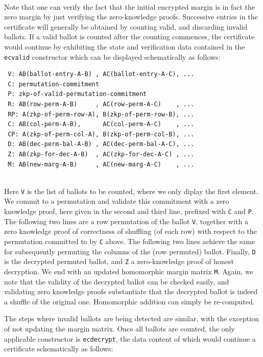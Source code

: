  \mbox{}\\[-5ex]
 Note that one can verify the fact that the initial encrypted margin
 is in fact the zero margin by just verifying the zero-knowledge
 proofs. Successive entries in the certificate will generally be
 obtained by counting valid, and discarding invalid ballots. If a
 valid ballot is counted after the counting commences, the
 certificate would continue by exhibiting the state and verification
 data contained in the \texttt{ecvalid} constructor which can be
 displayed schematically as follows:

 {\small\begin{verbatim}
 V: AB(ballot-entry-A-B) , AC(ballot-entry-A-C), ...
 C: permutation-commitment
 P: zkp-of-valid-permutation-commitment
 R: AB(row-perm-A-B)     , AC(row-perm-A-C)    , ...
 RP: A(zkp-of-perm-row-A), B(zkp-of-perm-row-B), ... 
 C: AB(col-perm-A-B),      AC(col-perm-A-C)    , ...
 CP: A(zkp-of-perm-col-A), B(zkp-of-perm-col-B), ...
 D: AB(dec-perm-bal-A-B) , AC(dec-perm-bal-A-C), ...
 Z: AB(zkp-for-dec-A-B)  , AC(zkp-for-dec-A-C) , ...
 M: AB(new-marg-A-B)     , AC(new-marg-A-C)    , ...
 \end{verbatim}}

 \mbox{}\\[-5ex]
 Here \texttt{V} is the list of ballots to be counted, where we only
 diplay the first element. We
 commit to a permutation and validate this commitment with a zero
 knowledge proof, here given in the second and third line, prefixed
 with \texttt{C} and \texttt{P}. The following two lines are a row
 permutation of the ballot \texttt{V}, together with a zero
 knowledge proof of correctness of shuffling (of each row) with
 respect to the permutation committed to by \texttt{C} above. The
 following two lines achieve the same for subsequently permuting the
 columns of the (row permuted) ballot. Finally, \texttt{D} is the
 decrypted permuted ballot, and \texttt{Z} a zero-knowledge proof of
 honest decryption. We end with an updated homomorphic margin
 matrix \texttt{M}. Again, we note that the validity of the
 decrypted ballot can be checked easily, and validating zero
 knowledge proofs substantiate that the decrypted ballot is indeed a
 shuffle of the original one. Homomorphic addition can simply be
 re-computed.

 The steps where invalid ballots are being detected are similar, with
 the exception of not updating the margin matrix. Once all ballots
 are counted, the only applicable constructor is \texttt{ecdecrypt},
 the data content of which would continue a certificate
 schematically as follows:

